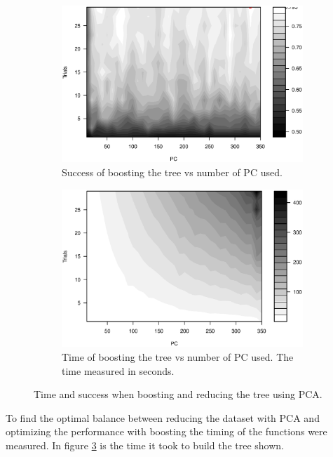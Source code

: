 \begin{figure}[H]
\centering
\begin{subfigure}{0.7\textwidth}
\centering
\includegraphics[width=\textwidth]{graphics/tree_pca_vs_boost_success}
\caption{Success of boosting the tree vs number of PC used.}
\label{fig:tree_pca_boost}
\end{subfigure}
\begin{subfigure}{0.70\textwidth}
\includegraphics[width=\textwidth]{graphics/tree_pca_vs_boost_time}
\caption{Time of boosting the tree vs number of PC used. The time measured in seconds.}
\label{fig:tree_pca_boost_timing}
\end{subfigure}
\caption{Time and success when boosting and reducing the tree using PCA.}
\end{figure}

To find the optimal balance between reducing the dataset with PCA and optimizing the performance with boosting the timing of the functions were measured.
In figure \ref{fig:tree_pca_boost_timing} is the time it took to build the tree shown.



